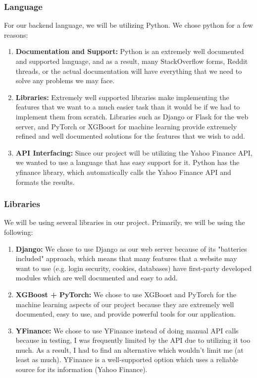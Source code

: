 \documentclass[11pt]{article}
\begin{document}
        \subsubsection{Language} For our backend language, we will be utilizing Python. We chose python for a few reasons:
        \begin{enumerate}
            \item \textbf{Documentation and Support:} Python is an extremely well documented and supported language, and as a result, many StackOverflow
            forms, Reddit threads, or the actual documentation will have everything that we need to solve any problems we
            may face.
            \item \textbf{Libraries:} Extremely well supported libraries make implementing the features that we want to
            a much easier task than it would be if we had to implement them from scratch. Libraries such as Django
            or Flask for the web server, and PyTorch or XGBoost for machine learning provide extremely refined
            and well documented solutions for the features that we wish to add.
            \item \textbf{API Interfacing:} Since our project will be utilizing the Yahoo Finance API, we wanted to
            use a language that has easy support for it. Python has the yfinance library, which automatically calls
            the Yahoo Finance API and formats the results.
        \end{enumerate}

        \subsubsection{Libraries} We will be using several libraries in our project. Primarily, we will be
        using the following:
        \begin{enumerate}
            \item \textbf{Django:} We chose to use Django as our web server because of its "batteries included" approach,
            which means that many features that a website may want to use (e.g. login security, cookies,
            databases) have first-party developed modules which are well documented and easy to add.
            \item \textbf{XGBoost + PyTorch:} We chose to use XGBoost and PyTorch for the machine
            learning aspects of our project because they are extremely well documented, easy to use,
            and provide powerful tools for our application.
            \item \textbf{YFinance:} We chose to use YFinance instead of doing manual API calls because
            in testing, I was frequently limited by the API due to utilizing it too much. As a result,
            I had to find an alternative which wouldn't limit me (at least as much). YFinance is a 
            well-supported option which uses a reliable source for its information (Yahoo Finance).
        \end{enumerate}
\end{document}
